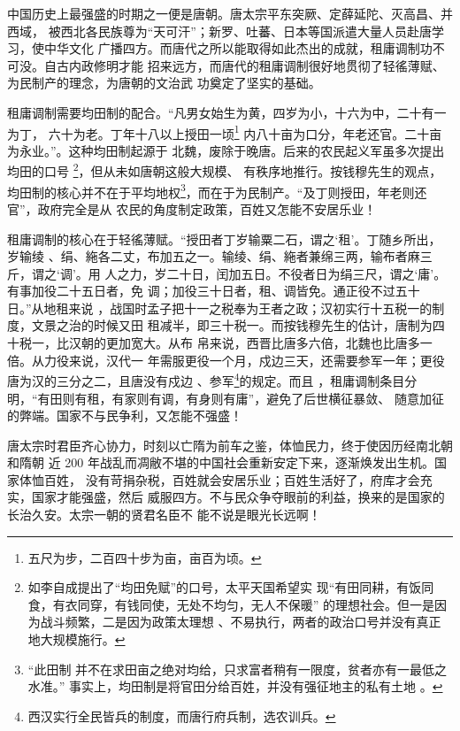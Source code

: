 中国历史上最强盛的时期之一便是唐朝。唐太宗平东突厥、定薛延陀、灭高昌、并西域，
被西北各民族尊为“天可汗”；新罗、吐蕃、日本等国派遣大量人员赴唐学习，使中华文化
广播四方。而唐代之所以能取得如此杰出的成就，租庸调制功不可没。自古内政修明才能
招来远方，而唐代的租庸调制很好地贯彻了轻徭薄赋、为民制产的理念，为唐朝的文治武
功奠定了坚实的基础。

租庸调制需要均田制的配合。“凡男女始生为黄，四岁为小，十六为中，二十有一为丁，
六十为老。丁年十八以上授田一顷\footnote{五尺为步，二百四十步为亩，亩百为顷。}
内八十亩为口分，年老还官。二十亩为永业。”\parencite{qianmu}。这种均田制起源于
北魏，废除于晚唐。\parencite{wkpd-jtz}后来的农民起义军虽多次提出均田的口号
\footnote{如李自成提出了“均田免赋”\parencite{bdbk-jtmf}的口号，太平天国希望实
    现“有田同耕，有饭同食，有衣同穿，有钱同使，无处不均匀，无人不保暖”
    \parencite{wkpd-tctmzd}的理想社会。但一是因为战斗频繁，二是因为政策太理想
、不易执行，两者的政治口号并没有真正地大规模施行。}，但从未如唐朝这般大规模、
有秩序地推行。按钱穆先生的观点，均田制的核心并不在于平均地权\footnote{“此田制
    并不在求田亩之绝对均给，只求富者稍有一限度，贫者亦有一最低之水准。”
    \parencite{qianmu}事实上，均田制是将官田分给百姓，并没有强征地主的私有土地
。}，而在于为民制产。“及丁则授田，年老则还官”\parencite{qianmu}，政府完全是从
农民的角度制定政策，百姓又怎能不安居乐业！

租庸调制的核心在于轻徭薄赋。“授田者丁岁输粟二石，谓之‘租’。丁随乡所出，岁输绫
、绢、絁各二丈，布加五之一。输绫、绢、絁者兼绵三两，输布者麻三斤，谓之‘调’。用
人之力，岁二十日，闰加五日。不役者日为绢三尺，谓之‘庸’。有事加役二十五日者，免
调；加役三十日者，租、调皆免。通正役不过五十日。”\parencite{qianmu}从地租来说
，战国时孟子把十一之税奉为王者之政；汉初实行十五税一的制度，文景之治的时候又田
租减半，即三十税一。而按钱穆先生的估计，唐制为四十税一，比汉朝的更加宽大。从布
帛来说，西晋比唐多六倍，北魏也比唐多一倍。\parencite{qianmu}从力役来说，汉代一
年需服更役一个月，戍边三天，还需要参军一年；更役唐为汉的三分之二，且唐没有戍边
、参军\footnote{西汉实行全民皆兵的制度，而唐行府兵制，选农训兵。}的规定。而且
，租庸调制条目分明，“有田则有租，有家则有调，有身则有庸”，避免了后世横征暴敛、
随意加征的弊端。国家不与民争利，又怎能不强盛！

唐太宗时君臣齐心协力，时刻以亡隋为前车之鉴，体恤民力，终于使因历经南北朝和隋朝
近 200 年战乱而凋敝不堪的中国社会重新安定下来，逐渐焕发出生机。国家体恤百姓，
没有苛捐杂税，百姓就会安居乐业；百姓生活好了，府库才会充实，国家才能强盛，然后
威服四方。不与民众争夺眼前的利益，换来的是国家的长治久安。太宗一朝的贤君名臣不
能不说是眼光长远啊！

